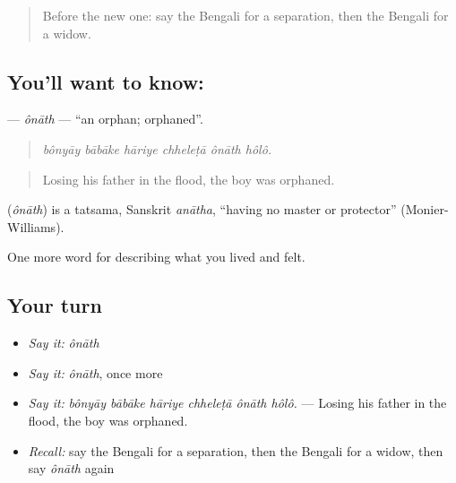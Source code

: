 \label{lesson:BN-C490-onath}



\begin{quote}
Before the new one: say the Bengali for a separation, then the Bengali for a widow.
\end{quote}

\subsection*{You'll want to know: }
\textbf{} — \emph{ônāth} — \textquotedblleft{}an orphan; orphaned\textquotedblright{}.

\begin{quote}
     
\end{quote}

\begin{quote}
\emph{bônyāy bābāke hāriye chheleṭā ônāth hôlô.}
\end{quote}

\begin{quote}
Losing his father in the flood, the boy was orphaned.
\end{quote}

\begin{cousinweb}
\textbf{} (\emph{ônāth}) is a tatsama, Sanskrit \emph{anātha}, \textquotedblleft{}having no master or protector\textquotedblright{} (Monier-Williams).
\end{cousinweb}

\begin{grammarlens}[title={What you've built}]
One more word for describing what you lived and felt.
\end{grammarlens}

\subsection*{Your turn}
\begin{itemize}
\raggedright
  \item \emph{Say it:} \emph{ônāth}
  \item \emph{Say it:} \emph{ônāth}, once more
  \item \emph{Say it:} \emph{bônyāy bābāke hāriye chheleṭā ônāth hôlô.} — Losing his father in the flood, the boy was orphaned.
  \item \emph{Recall:} say the Bengali for a separation, then the Bengali for a widow, then say \emph{ônāth} again
\end{itemize}

